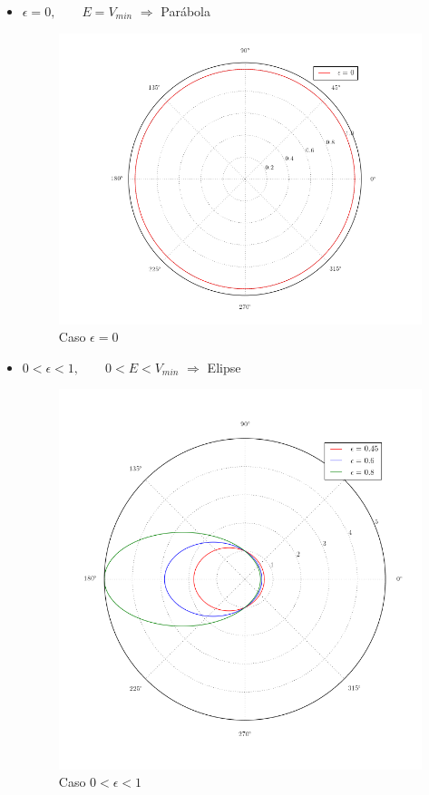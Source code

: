 \documentclass[a4paper,10pt]{article}
\numberwithin{equation}{section}
\begin{document}
\begin{itemize}
 \item $\epsilon = 0, \qquad E=V_{min}$ $\Rightarrow$ Parábola

\begin{figure}[H]
 \center 
 \includegraphics[scale=0.4]{problema5fig3}
 \caption{Caso $\epsilon = 0$}
\end{figure}

\newpage

 \item $0 < \epsilon < 1, \qquad  0 < E < V_{min}$ $\Rightarrow$ Elipse

\begin{figure}[H]
 \center 
 \includegraphics[scale=0.45]{problema5fig4}
 \caption{Caso $0 < \epsilon < 1$}
\end{figure}


\end{itemize}
\end{document}
